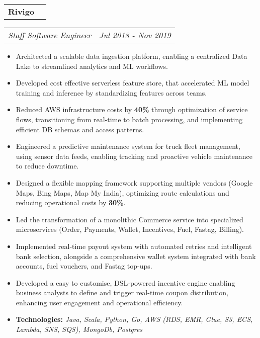 \documentclass[a4paper,11pt]{article}
\makeatletter
\newcommand{\resitem}[1]{\item #1}
\newcommand{\resCompany}[1]{
    \begin{tabular*}{\textwidth}{l @{\extracolsep{\fill}} r}
    \large \textbf{#1}
  \end{tabular*}
}
\newcommand{\resPosition}[2]{
    \begin{tabular*}{\textwidth}{l @{\extracolsep{\fill}} r}
        \textit{#1} & \textit{#2}
    \end{tabular*}
}
\makeatother
\begin{document}
    \indent \resCompany{Rivigo}
        \indent \resPosition{Staff Software Engineer}{Jul 2018 - Nov 2019}
        \begin{itemize}[leftmargin=30pt, rightmargin=-16pt, itemsep=-2pt]
            \setlength{\itemsep}{-3pt}
            
            \resitem{Architected a scalable data ingestion platform, enabling a centralized Data Lake to streamlined analytics and ML workflows.}
            
            \resitem{Developed cost effective serverless feature store, that accelerated ML model training and inference by standardizing features across teams.}
            
            \resitem{Reduced AWS infrastructure costs by \textbf{40\%} through optimization of service flows, transitioning from real-time to batch processing, and implementing efficient DB schemas and access patterns.}
            
            \resitem{Engineered a predictive maintenance system for truck fleet management, using sensor data feeds, enabling tracking and proactive vehicle maintenance to reduce downtime.}
            
            \resitem{Designed a flexible mapping framework supporting multiple vendors (Google Maps, Bing Maps, Map My India), optimizing route calculations and reducing operational costs by \textbf{30\%}.}
            
            \resitem{Led the transformation of a monolithic Commerce service into specialized microservices (Order, Payments, Wallet, Incentives, Fuel, Fastag, Billing).}
            
            \resitem{Implemented real-time payout system with automated retries and intelligent bank selection, alongside a comprehensive wallet system integrated with bank accounts, fuel vouchers, and Fastag top-ups.}
            
            \resitem{Developed a easy to customise, DSL-powered incentive engine enabling business analysts to define and trigger real-time coupon distribution, enhancing user engagement and operational efficiency.}

            \resitem{\textbf{Technologies:} \textit{Java, Scala, Python, Go, AWS (RDS, EMR, Glue, S3, ECS, Lambda, SNS, SQS), MongoDb, Postgres}}
            
        \end{itemize}
        
\end{document}
